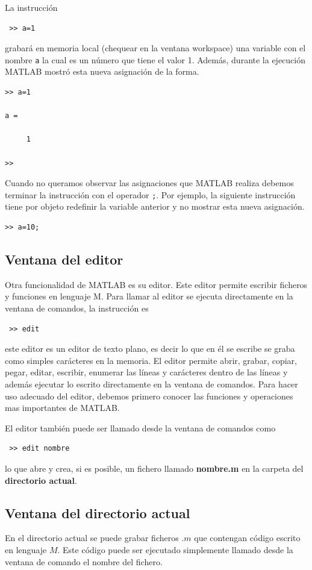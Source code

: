 \documentclass[11pt,legalpaper]{article}
\begin{document}
La instrucci\'on
\begin{verbatim}
 >> a=1
\end{verbatim}
grabar\'a en memoria local (chequear en la ventana workspace) una variable con el nombre \texttt{a} la cual es un n\'umero 
que tiene el valor 1. Adem\'as, durante la ejecuci\'on MATLAB mostr\'o esta nueva asignaci\'on de la forma.
\begin{verbatim}
>> a=1

a =

     1

>>
\end{verbatim}
Cuando no queramos observar las asignaciones que MATLAB realiza debemos terminar la instrucci\'on con el operador \texttt{;}. 
Por ejemplo, la siguiente instrucci\'on tiene por objeto redefinir la variable anterior y no mostrar esta nueva asignaci\'on.
\begin{verbatim}
>> a=10;
\end{verbatim}
%
\subsection{Ventana del editor}
Otra funcionalidad de MATLAB es su editor. Este editor permite escribir ficheros y funciones en lenguaje M. Para llamar 
al editor se ejecuta directamente en la ventana de comandos, la instrucci\'on es 
\begin{verbatim}
 >> edit
\end{verbatim}
este editor es un editor de texto plano, es decir lo que en \'el se escribe se graba como simples car\'acteres en la memoria. 
El editor permite abrir, grabar, copiar, pegar, editar, escribir, enumerar las l\'ineas y car\'acteres dentro de las l\'ineas y 
adem\'as ejecutar lo escrito directamente en la ventana de comandos. Para hacer uso adecuado del editor, debemos primero conocer 
las funciones y operaciones mas importantes de MATLAB.

El editor tambi\'en puede ser llamado desde la ventana de comandos como
\begin{verbatim}
 >> edit nombre
\end{verbatim}
lo que abre y crea, si es posible, un fichero llamado \textbf{nombre.m} en la carpeta del \textbf{directorio actual}.

\subsection{Ventana del directorio actual}
  En el directorio actual se puede grabar ficheros $.m$ que contengan c\'odigo escrito 
  en lenguaje $M$. Este c\'odigo puede ser ejecutado simplemente llamado desde 
  la ventana de comando el nombre del fichero.
  
\end{document}
